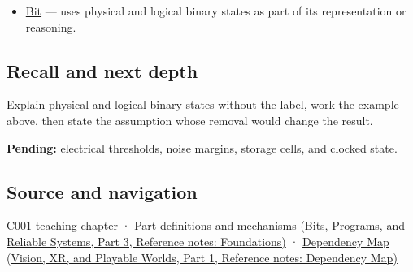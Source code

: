 \begin{itemize}
\tightlist
\item
  \hyperref[appendix-ddbb69998a2e]{Bit} --- uses physical and logical binary states as part of its representation or reasoning.
\end{itemize}

\subsection{Recall and next depth}\label{appendix-ea798b1ceb35-recall-and-next-depth}

\hypertarget{appendix-ea798b1ceb35-recall-and-next-depth}{}

Explain physical and logical binary states without the label, work the example above, then state the assumption whose removal would change the result.

\textbf{Pending:} electrical thresholds, noise margins, storage cells, and clocked state.

\subsection{Source and navigation}\label{appendix-ea798b1ceb35-source-and-navigation}

\hypertarget{appendix-ea798b1ceb35-source-and-navigation}{}

\hyperref[01-foundations-i-ch001-from-a-signal-to-an-interpretation]{C001 teaching chapter} · \href{../01-Bits-Programs-and-Reliable-Systems-P03/main.pdf\#nameddest=appendix-fd090d982a15}{Part definitions and mechanisms (Bits, Programs, and Reliable Systems, Part 3, Reference notes: Foundations)} · \href{../07-Vision-XR-and-Playable-Worlds-P01/main.pdf\#nameddest=appendix-4ad47bdd269a}{Dependency Map (Vision, XR, and Playable Worlds, Part 1, Reference notes: Dependency Map)}
